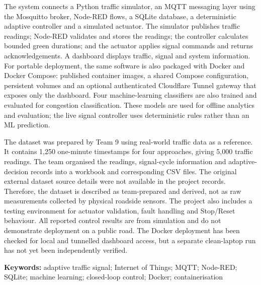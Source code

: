 \documentclass[12pt,a4paper,oneside]{report}
\begin{document}
The system connects a Python traffic simulator, an MQTT messaging layer using the Mosquitto broker, Node-RED flows, a SQLite database, a deterministic adaptive controller and a simulated actuator. The simulator publishes traffic readings; Node-RED validates and stores the readings; the controller calculates bounded green durations; and the actuator applies signal commands and returns acknowledgements. A dashboard displays traffic, signal and system information. For portable deployment, the same software is also packaged with Docker and Docker Compose: published container images, a shared Compose configuration, persistent volumes and an optional authenticated Cloudflare Tunnel gateway that exposes only the dashboard. Four machine-learning classifiers are also trained and evaluated for congestion classification. These models are used for offline analytics and evaluation; the live signal controller uses deterministic rules rather than an ML prediction.

The dataset was prepared by Team 9 using real-world traffic data as a reference. It contains 1,250 one-minute timestamps for four approaches, giving 5,000 traffic readings. The team organised the readings, signal-cycle information and adaptive-decision records into a workbook and corresponding CSV files. The original external dataset source details were not available in the project records. Therefore, the dataset is described as team-prepared and derived, not as raw measurements collected by physical roadside sensors. The project also includes a testing environment for actuator validation, fault handling and Stop/Reset behaviour. All reported control results are from simulation and do not demonstrate deployment on a public road. The Docker deployment has been checked for local and tunnelled dashboard access, but a separate clean-laptop run has not yet been independently verified.

\textbf{Keywords:} adaptive traffic signal; Internet of Things; MQTT; Node-RED; SQLite; machine learning; closed-loop control; Docker; containerisation
\end{document}

